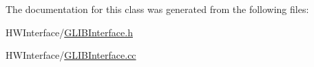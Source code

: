 The documentation for this class was generated from the following files\-:\begin{DoxyCompactItemize}
\item 
H\-W\-Interface/\hyperlink{_g_l_i_b_interface_8h}{G\-L\-I\-B\-Interface.\-h}\item 
H\-W\-Interface/\hyperlink{_g_l_i_b_interface_8cc}{G\-L\-I\-B\-Interface.\-cc}\end{DoxyCompactItemize}
